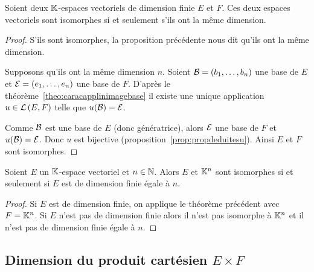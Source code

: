 \begin{theo}
  Soient deux \(\mathbb{K}\)-espaces vectoriels de dimension finie \(E\) et \(F\). Ces
  deux espaces vectoriels sont isomorphes si et seulement s'ils ont la même
  dimension.
\end{theo}
\begin{proof}
  S'ils sont isomorphes, la proposition précédente nous dit qu'ils ont la même
  dimension.

  Supposons qu'ils ont la même dimension \(n\). Soient \(\mathcal{B}=(b_1, \ldots, b_n)\)
  une base de \(E\) et \(\mathcal{E}=(e_1, \ldots, e_n)\) une base de \(F\). D'après le
  théorème~\ref{theo:caracapplinimagebase} il existe une unique application \(u \in
  \mathcal{L}\left(E,F\right)\) telle que \(u(\mathcal{B})=\mathcal{E}\).

  Comme \(\mathcal{B}\) est une base de \(E\) (donc génératrice), alors \(\mathcal{E}\) une base
  de \(F\) et \(u(\mathcal{B})=\mathcal{E}\). Donc \(u\) est bijective (proposition~\ref{prop:propdeduitesu}). Ainsi \(E\) et \(F\) sont isomorphes.
\end{proof}

\begin{corth}
  Soient \(E\) un \(\mathbb{K}\)-espace vectoriel et \(n \in \mathbb{N}\). Alors \(E\) et
  \(\mathbb{K}^n\) sont isomorphes si et seulement si \(E\) est de dimension finie égale
  à \(n\).
\end{corth}
\begin{proof}
  Si \(E\) est de dimension finie, on applique le théorème précédent avec
  \(F=\mathbb{K}^n\). Si \(E\) n'est pas de dimension finie alors il n'est pas isomorphe
  à \(\mathbb{K}^n\) et il n'est pas de dimension finie égale à \(n\).
\end{proof}

\subsection{Dimension du produit cartésien \(E \times F\)}

